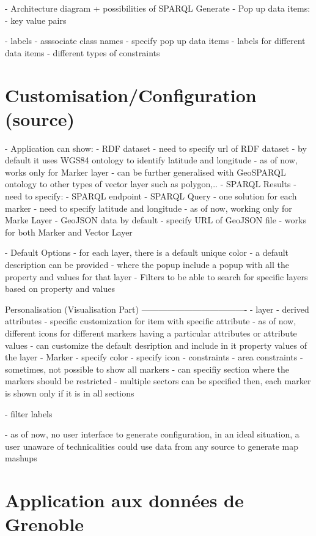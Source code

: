 \documentclass[a4paper,pagenum,english]{rnti}
\begin{document}
- Architecture diagram + possibilities of SPARQL Generate
- Pop up data items:
	- key value pairs

- labels 
- asssociate class names
- specify pop up data items
	- labels for different data items
- different types of constraints
\section{Customisation/Configuration (source) }
- Application can show:
	- RDF dataset
		- need to specify url of RDF dataset
		- by default it uses WGS84 ontology to identify latitude and longitude
		- as of now, works only for Marker layer
		- can be further generalised with GeoSPARQL ontology to other types of vector layer such as polygon,.. 
	- SPARQL Results
		- need to specify:
			- SPARQL endpoint
			- SPARQL Query
			- one solution for each marker
			- need to specify latitude and longitude
			- as of now, working only for Marke Layer
	- GeoJSON data by default
		- specify URL of GeoJSON file
		- works for both Marker and Vector Layer

- Default Options
	- for each layer, there is a default unique color
	- a default description can be provided
		- where the popup include a popup with all the property and values for that layer
	- Filters to be able to search for specific layers based on property and values

Personalisation (Visualisation Part)
-------------------------------------
	- layer
		- derived attributes
		- specific customization for item with specific attribute
			- as of now, different icons for different markers having a particular attributes or attribute values
		- can customize the default desription and include in it property values of the layer
	- Marker
		- specify color
		- specify icon
	- constraints
		- area constraints
			- sometimes, not possible to show all markers
			- can specifiy section where the markers should be restricted
			- multiple sectors can be specified then, each marker is shown only if it is in all sections

	- filter labels

- as of now, no user interface to generate configuration, in an ideal situation, a user unaware of technicalities could use data from any source to generate map mashups

\section{Application aux données de Grenoble}
\end{document}
